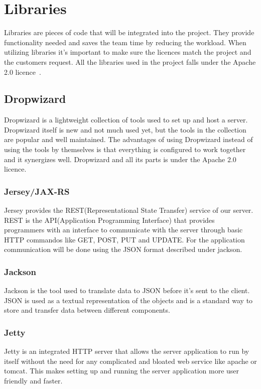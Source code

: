 \section{Libraries}
Libraries are pieces of code that will be integrated into the project. They provide functionality needed and saves the team time by reducing the workload. When utilizing libraries it’s important to make sure the licences match the project and the customers request. All the libraries used in the project falls under the Apache 2.0 licence~\cite{apache}.

\subsection{Dropwizard}
Dropwizard is a lightweight collection of tools used to set up and host a server. Dropwizard itself is new and not much used yet, but the tools in the collection are popular and well maintained. The advantages of using Dropwizard instead of using the tools by themselves is that everything is configured to work together and it synergizes well.
Dropwizard and all its parts is under the Apache 2.0 licence. 

\subsubsection{Jersey/JAX-RS}
Jersey provides the REST(Representational State Transfer) service of our server. REST is the API(Application Programming Interface) that provides programmers with an interface to communicate with the server through basic HTTP commandos like GET, POST, PUT and UPDATE. For the application communication will be done using the JSON format described under jackson.

\subsubsection{Jackson}
Jackson is the tool used to translate data to JSON before it’s sent to the client. JSON is used as a textual representation of the objects and is a standard way to store and transfer data between different components.

\subsubsection{Jetty}
Jetty is an integrated HTTP server that allows the server application to run by itself without the need for any  complicated and bloated web service like apache or tomcat. This makes setting up and running the server application more user friendly and faster.

